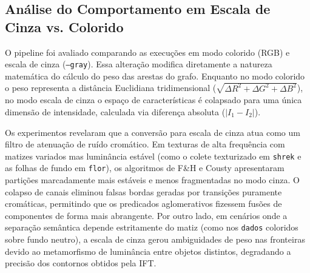 \documentclass{sbc2023}
\begin{document}
\subsection{Análise do Comportamento em Escala de Cinza vs. Colorido}

O pipeline foi avaliado comparando as execuções em modo colorido (RGB) e escala de cinza (\texttt{--gray}). Essa alteração modifica diretamente a natureza matemática do cálculo do peso das arestas do grafo. Enquanto no modo colorido o peso representa a distância Euclidiana tridimensional ($\sqrt{\Delta R^2 + \Delta G^2 + \Delta B^2}$), no modo escala de cinza o espaço de características é colapsado para uma única dimensão de intensidade, calculada via diferença absoluta ($|I_1 - I_2|$).

Os experimentos revelaram que a conversão para escala de cinza atua como um filtro de atenuação de ruído cromático. Em texturas de alta frequência com matizes variados mas luminância estável (como o colete texturizado em \texttt{shrek} e as folhas de fundo em \texttt{flor}), os algoritmos de F\&H e Cousty apresentaram partições marcadamente mais estáveis e menos fragmentadas no modo cinza. O colapso de canais eliminou falsas bordas geradas por transições puramente cromáticas, permitindo que os predicados aglomerativos fizessem fusões de componentes de forma mais abrangente. Por outro lado, em cenários onde a separação semântica depende estritamente do matiz (como nos \texttt{dados} coloridos sobre fundo neutro), a escala de cinza gerou ambiguidades de peso nas fronteiras devido ao metamorﬁsmo de luminância entre objetos distintos, degradando a precisão dos contornos obtidos pela IFT.
\end{document}
